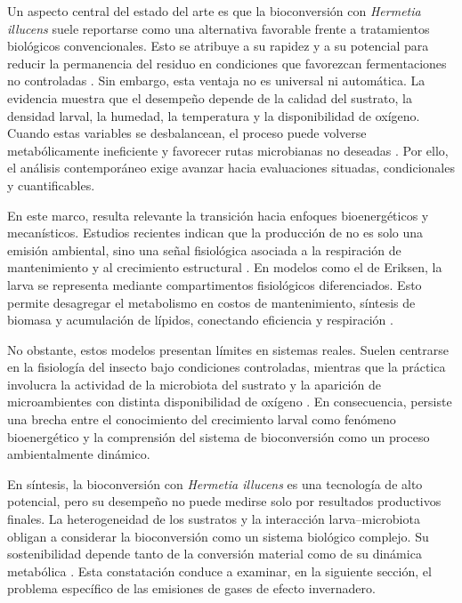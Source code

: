 Un aspecto central del estado del arte es que la bioconversión con \textit{Hermetia illucens} suele reportarse como una alternativa favorable frente a tratamientos biológicos convencionales. Esto se atribuye a su rapidez y a su potencial para reducir la permanencia del residuo en condiciones que favorezcan fermentaciones no controladas \parencite{jenkinsProcessingPoultryManure2025,ermolaevGreenhouseGasEmissions2019,lindbergProcessEfficiencyGreenhouse2022a}. Sin embargo, esta ventaja no es universal ni automática. La evidencia muestra que el desempeño depende de la calidad del sustrato, la densidad larval, la humedad, la temperatura y la disponibilidad de oxígeno. Cuando estas variables se desbalancean, el proceso puede volverse metabólicamente ineficiente y favorecer rutas microbianas no deseadas \parencite{bekkerImpactSubstrateMoisture2021a,chenEffectMoistureContent2019,rossiEstimatingDynamicsGreenhouse2024a,laganaroGrowthMetabolicPerformance2021a}. Por ello, el análisis contemporáneo exige avanzar hacia evaluaciones situadas, condicionales y cuantificables.

En este marco, resulta relevante la transición hacia enfoques bioenergéticos y mecanísticos. Estudios recientes indican que la producción de  no es solo una emisión ambiental, sino una señal fisiológica asociada a la respiración de mantenimiento y al crecimiento estructural \parencite{eriksenDynamicModellingFeed2022}. En modelos como el de Eriksen, la larva se representa mediante compartimentos fisiológicos diferenciados. Esto permite desagregar el metabolismo en costos de mantenimiento, síntesis de biomasa y acumulación de lípidos, conectando eficiencia y respiración \parencite{eriksenDynamicModellingFeed2022,grausaMetabolicModelingHermetia2023}. 

No obstante, estos modelos presentan límites en sistemas reales. Suelen centrarse en la fisiología del insecto bajo condiciones controladas, mientras que la práctica involucra la actividad de la microbiota del sustrato y la aparición de microambientes con distinta disponibilidad de oxígeno \parencite{rossiEstimatingDynamicsGreenhouse2024a,bekkerImpactSubstrateMoisture2021a,chenEffectMoistureContent2019}. En consecuencia, persiste una brecha entre el conocimiento del crecimiento larval como fenómeno bioenergético y la comprensión del sistema de bioconversión como un proceso ambientalmente dinámico.

En síntesis, la bioconversión con \textit{Hermetia illucens} es una tecnología de alto potencial, pero su desempeño no puede medirse solo por resultados productivos finales. La heterogeneidad de los sustratos y la interacción larva--microbiota obligan a considerar la bioconversión como un sistema biológico complejo. Su sostenibilidad depende tanto de la conversión material como de su dinámica metabólica \parencite{rossiEstimatingDynamicsGreenhouse2024a,boakye-yiadomGreenhouseGasEmissions2022,eriksenDynamicModellingFeed2022}. Esta constatación conduce a examinar, en la siguiente sección, el problema específico de las emisiones de gases de efecto invernadero.

